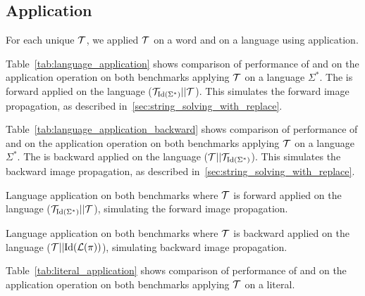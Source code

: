 \subsection{Application}

For each unique \nft $\mathcal{T}$, we applied $\mathcal{T}$ on a word and on a language using \nft application.


Table~\ref{tab:language_application} shows comparison of performance of \mata and \mona on the application operation on both benchmarks applying $\mathcal{T}$ on a language $\Sigma^*$.
The \nft is forward applied on the language ($\mathcal{T}_{\text{Id}(\Sigma^*)} || \mathcal{T} $).
This simulates the forward image propagation, as described in~\ref{sec:string_solving_with_replace}.

Table~\ref{tab:language_application_backward} shows comparison of performance of \mata and \mona on the application operation on both benchmarks applying $\mathcal{T}$ on a language $\Sigma^*$.
The \nft is backward applied on the language ($\mathcal{T} || \mathcal{T}_{\text{Id}(\Sigma^*)}$).
This simulates the backward image propagation, as described in~\ref{sec:string_solving_with_replace}.

\begin{table}[ht]
  \centering
  
  \caption{
    Language application on both benchmarks where $\mathcal{T}$ is forward applied on the language ($\mathcal{T}_{\text{Id}(\Sigma^*)} || \mathcal{T}$), simulating the forward image propagation.
  }
  \label{tab:language_application}
\end{table}

\begin{table}[ht]
  \centering
  
  \caption{
    Language application on both benchmarks where $\mathcal{T}$ is backward applied on the language ($\mathcal{T} || \text{Id}(\mathcal{L}(\pi))$), simulating backward image propagation.
  }
  \label{tab:language_application_backward}
\end{table}


Table~\ref{tab:literal_application} shows comparison of performance of \mata and \mona on the application operation on both benchmarks applying $\mathcal{T}$ on a literal.

